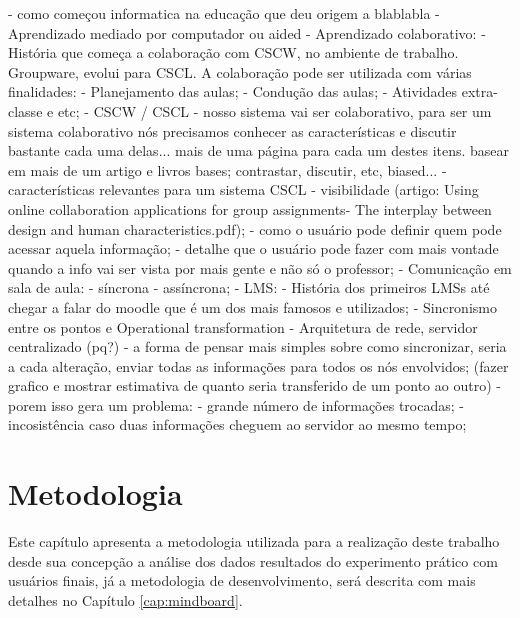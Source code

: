             - como começou informatica na educação que deu origem a blablabla
            - Aprendizado mediado por computador ou aided
            - Aprendizado colaborativo:
                - História que começa a colaboração com CSCW, no ambiente de trabalho. Groupware, evolui para CSCL. A colaboração pode ser utilizada com várias finalidades:
                    - Planejamento das aulas;
                    - Condução das aulas;
                    - Atividades extra-classe e etc;
                - CSCW / CSCL
                    - nosso sistema vai ser colaborativo, para ser um sistema colaborativo nós precisamos conhecer as características e discutir bastante cada uma delas... mais de uma página para cada um destes itens. basear em mais de um artigo e livros bases; contrastar, discutir, etc, biased...
                    - características relevantes para um sistema CSCL
                        - visibilidade (artigo: Using online collaboration applications for group assignments- The interplay between design and human characteristics.pdf);
                    - como o usuário pode definir quem pode acessar aquela informação;
                    - detalhe que o usuário pode fazer com mais vontade quando a info vai ser vista por mais gente e não só o professor;
                        - Comunicação em sala de aula: 
                            - síncrona 
                            - assíncrona;
            - LMS:
                - História dos primeiros LMSs até chegar a falar do moodle que é um dos mais famosos e utilizados;
            - Sincronismo entre os pontos e Operational transformation
                - Arquitetura de rede, servidor centralizado (pq?)
                - a forma de pensar mais simples sobre como sincronizar, seria a cada alteração, enviar todas as informações para todos os nós envolvidos;
                (fazer grafico e mostrar estimativa de quanto seria transferido de um ponto ao outro)
                    - porem isso gera um problema: 
                        - grande número de informações trocadas;
                        - incosistência caso duas informações cheguem ao servidor ao mesmo tempo;


\chapter{Metodologia}

Este capítulo apresenta a metodologia utilizada para a realização deste trabalho desde sua concepção a análise dos dados resultados do experimento prático com usuários finais, já a  metodologia de desenvolvimento, será descrita com mais detalhes no Capítulo \ref{cap:mindboard}. 

